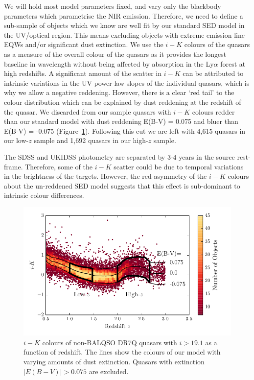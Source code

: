 We will hold most model parameters fixed, and vary only the blackbody parameters which parametrise the NIR emission. 
Therefore, we need to define a sub-sample of objects which we know are well fit by our standard SED model in the UV/optical region. 
This means excluding objects with extreme emission line EQWs and/or significant dust extinction.
We use the $i-K$ colours of the quasars as a measure of the overall colour of the quasars as it provides the longest baseline in wavelength without being affected by absorption in the Ly$\alpha$ forest at high redshifts. 
A significant amount of the scatter in $i-K$ can be attributed to intrinsic variations in the UV power-law slopes of the individual quasars, which is why we allow a negative reddening. 
However, there is a clear `red tail' to the colour distribution which can be explained by dust reddening at the redshift of the quasar.
We discarded from our sample quasars with $i - K$ colours redder than our standard model with dust reddening E(B-V) = 0.075 and bluer than E(B-V) = -0.075 (Figure~\ref{fig:ikzplot}). 
Following this cut we are left with 4,615 quasars in our low-$z$ sample and 1,692 quasars in our high-$z$ sample. 

The SDSS and UKIDSS photometry are separated by 3-4 years in the source rest-frame. 
Therefore, some of the $i-K$ scatter could be due to temporal variations in the brightness of the targets. 
However, the red-asymmetry of the $i-K$ colours about the un-reddened SED model suggests that this effect is sub-dominant to intrinsic colour differences. 

\begin{figure}
  \centering
  \includegraphics[width=\columnwidth]{figures/chapter05/ik_versus_z_low_ext.pdf}
  \caption[{$i-K$ colours of non-BALQSO DR7Q quasars with $i>19.1$ as a function of redshift.}]{$i-K$ colours of non-BALQSO DR7Q quasars with $i>19.1$ as a function of redshift. The lines show the colours of our model with varying amounts of dust extinction. Quasars with extinction $|E(B-V)|>0.075$ are excluded.}
  \label{fig:ikzplot}
\end{figure}

